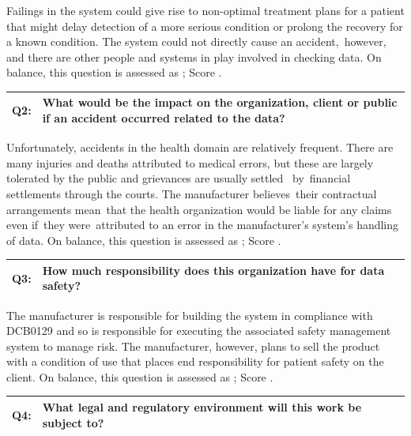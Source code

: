 Failings in the system could give rise to non-optimal treatment plans for a patient that might delay detection of a more serious condition or prolong the recovery for a known condition. \cbstart The system could not directly cause an accident,\cbend\ however, and there are other people and systems in play involved in checking data. On balance, this question is assessed as ; Score .

\begin{longtable*}[H]
  {|L{}|L{}|}
  \hline
  Q2: & What would be the impact on the organization, client or public if an accident occurred related to the data?\\
  \hline
\end{longtable*}

Unfortunately, accidents in the health domain are relatively frequent. There are many injuries and deaths attributed to medical errors, but these are largely tolerated by the public and grievances are usually settled \cbstart\ by\cbend\ financial settlements through the courts. The manufacturer believes\cbstart\ their contractual arrangements mean\cbend\ that the health organization would be liable for any claims even if\cbstart\ they were\cbend\ attributed to an error in the manufacturer's system's handling of data. On balance, this question is assessed as ; Score .

\clearpage %
\begin{longtable*}[H]
  {|L{}|L{}|}
  \hline
  Q3: & How much responsibility does this organization have for data safety?\\
  \hline
\end{longtable*}

The manufacturer is responsible for building the system in compliance with
DCB0129 \cite{citation:dcb0129clinical}
and so is responsible for executing the associated safety management system to manage risk. The manufacturer, however, plans to sell the product with a condition of use that places end responsibility for patient safety on the client. On balance, this question is assessed as ; Score .

\begin{longtable*}[H]
  {|L{}|L{}|}
  \hline
  Q4: & What legal and regulatory environment will this work be subject to?\\
  \hline
\end{longtable*}

